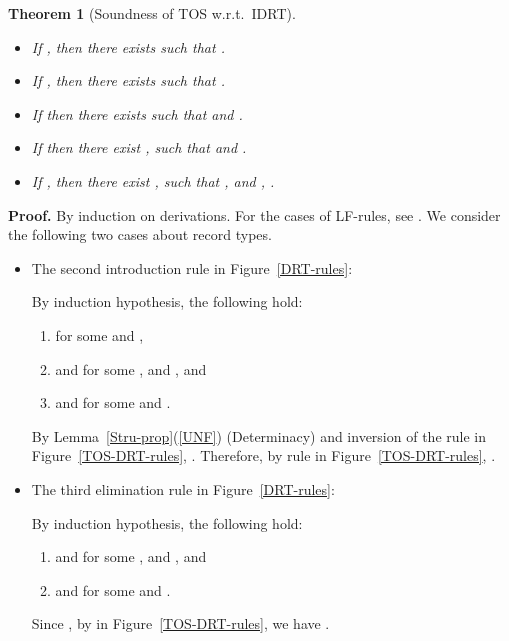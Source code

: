 \documentclass[submission,copyright,creativecommons]{eptcs}
\newtheorem{theorem}[definition]{Theorem}
\newcommand{\wrt}{{w.r.t.}}
\begin{document}
\begin{theorem}[Soundness of TOS \wrt\ IDRT] \label{Soundness-TOS-LF}\
\begin{itemize}
  \item If , then there exists  such that .
  \item If , then there exists  such that .
  \item If  then there exists  such that  and .
  \item If  then there exist ,  such that  and .
  \item If , then there exist ,  such that , and , .
\end{itemize}
\end{theorem}
\textbf{Proof.} By induction on derivations. For the cases of LF-rules, see \cite{healf:TLCA99YY}.  We consider the following two cases about record types.
\begin{itemize}
  \item The second introduction rule in Figure~\ref{DRT-rules}:
  
  By induction hypothesis, the following hold:
  \begin{enumerate}
    \item \label{(*)}
       for some  and ,
    \item  and  for some ,  and , and
    \item \label{(**)}
       and   for some  and .
  \end{enumerate}
  By Lemma~\ref{Stru-prop}(\ref{UNF}) (Determinacy) and inversion of the rule  in Figure~\ref{TOS-DRT-rules}, .  Therefore, by rule  in Figure~\ref{TOS-DRT-rules}, .

  \item The third elimination rule in Figure~\ref{DRT-rules}:
  
  By induction hypothesis, the following hold:
  \begin{enumerate}
    \item  and  for some ,  and , and
    \item  and  for some  and .
  \end{enumerate}
  Since , by  in Figure~\ref{TOS-DRT-rules}, we have .
\end{itemize}
\end{document}
